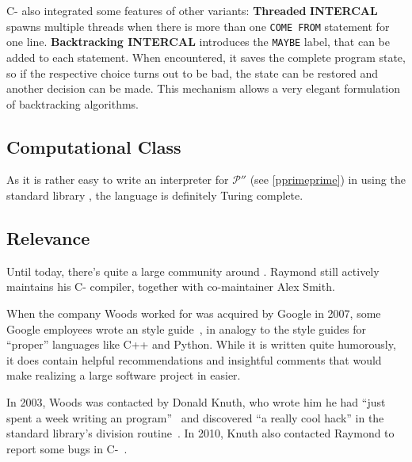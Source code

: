 C-\ic{} also integrated some features of other \ic{} variants: \textbf{Threaded} \textbf{INTERCAL} spawns multiple threads when there is more than one \texttt{COME FROM} statement for one line. \textbf{Backtracking INTERCAL} introduces the \texttt{MAYBE} label, that can be added to each statement. When encountered, it saves the complete program state, so if the respective choice turns out to be bad, the state can be restored and another decision can be made. This mechanism allows a very elegant formulation of backtracking algorithms.

\subsection{Computational Class}

As it is rather easy to write an interpreter for $\mathcal{P}''$ (see \cref{pprimeprime}) in \ic{} using the standard library \cite{alksentrs2008intercal}, the language is definitely Turing complete.

\subsection{Relevance}

Until today, there's quite a large community around \ic{}. Raymond still actively maintains his C-\ic{} compiler, together with co-maintainer Alex Smith.

When the company Woods worked for was acquired by Google in 2007, some Google employees wrote an \ic{} style guide~\cite{raiter2007google}, in analogy to the style guides for “proper” languages like C++ and Python. While it is written quite humorously, it does contain helpful recommendations and insightful comments that would make realizing a large software project in \ic{} easier.

In 2003, Woods was contacted by Donald Knuth, who wrote him he had “just spent a week writing an \ic{} program”~\cite{knuth2003tpk} and discovered “a really cool hack” in the standard library's division routine~\cite{hamilton2008az}. In 2010, Knuth also contacted Raymond to report some bugs in C-\ic{}~\cite{raymond2010donald}.
